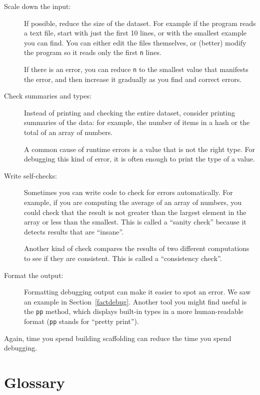 \documentclass[10pt]{book}
\begin{document}
\begin{description}

\item[Scale down the input:] If possible, reduce the size of the
dataset.  For example if the program reads a text file, start with
just the first 10 lines, or with the smallest example you can find.
You can either edit the files themselves, or (better) modify the
program so it reads only the first {\tt n} lines.

If there is an error, you can reduce {\tt n} to the smallest
value that manifests the error, and then increase it gradually
as you find and correct errors.

\item[Check summaries and types:] Instead of printing and checking the
entire dataset, consider printing summaries of the data: for example,
the number of items in a hash or the total of an array of numbers.

A common cause of runtime errors is a value that is not the right
type.  For debugging this kind of error, it is often enough to print
the type of a value.

\item[Write self-checks:]  Sometimes you can write code to check
for errors automatically.  For example, if you are computing the
average of an array of numbers, you could check that the result is
not greater than the largest element in the array or less than
the smallest.  This is called a ``sanity check'' because it detects
results that are ``insane''.

Another kind of check compares the results of two different
computations to see if they are consistent.  This is called a
``consistency check''.

\item[Format the output:] Formatting debugging output
can make it easier to spot an error.  We saw an example in
Section~\ref{factdebug}.  Another tool you might find useful is the {\tt pp} method, which
displays built-in types in
a more human-readable format ({\tt pp} stands for
``pretty print'').

\end{description}

Again, time you spend building scaffolding can reduce
the time you spend debugging.


\section{Glossary}
\end{document}
